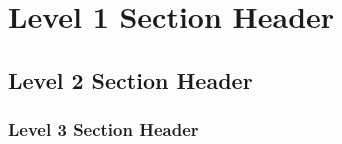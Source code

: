 \clearpage
\section{Level 1 Section Header}

\subsection{Level 2 Section Header}

\subsubsection{Level 3 Section Header}

